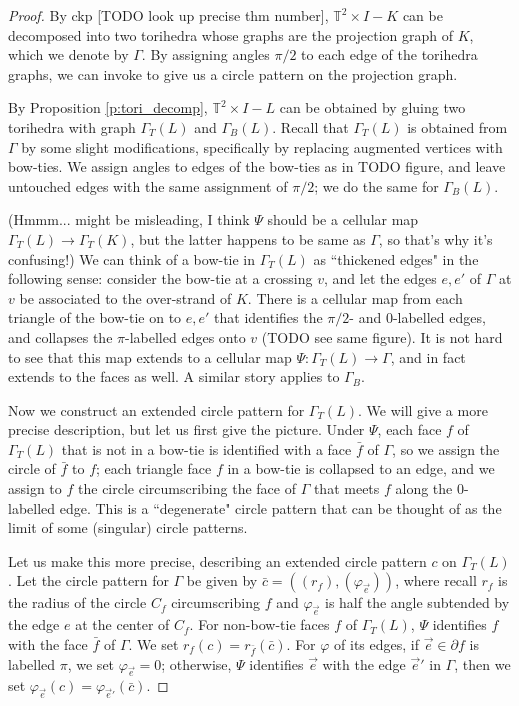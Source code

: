 \documentclass[11pt]{amsart}
\newcommand{\prpref}[1]{Proposition \ref{#1}}
\newcommand{\torus}{{\mathbb{T}^2}}
\newcommand{\del}{\partial}
\newcommand{\vphi}{\varphi}
\newcommand{\toruscomp}[1]{{\torus \times I - #1}}
\theoremstyle{plain}
\theoremstyle{definition}
\begin{document}
\begin{proof}
By ckp [TODO look up precise thm number],
$\toruscomp{K}$ can be decomposed
into two torihedra whose graphs are the projection graph of $K$,
which we denote by $\Gamma$.
By assigning angles $\pi/2$ to each edge of the torihedra graphs,
we can invoke \cite[Theorem 3]{BandS} to give us a circle pattern
on the projection graph.

By \prpref{p:tori_decomp}, $\toruscomp{L}$ can be
obtained by gluing two torihedra with graph $\Gamma_T(L)$ and $\Gamma_B(L)$.
Recall that $\Gamma_T(L)$ is obtained from $\Gamma$ by some slight
modifications, specifically by replacing augmented vertices with bow-ties.
We assign angles to edges of the bow-ties as in TODO figure,
and leave untouched edges with the same assignment of $\pi/2$;
we do the same for $\Gamma_B(L)$.


(Hmmm... might be misleading, I think $\Psi$ should be a cellular map
$\Gamma_T(L) \to \Gamma_T(K)$, but the latter happens to be
same as $\Gamma$, so that's why it's confusing!)
We can think of a bow-tie in $\Gamma_T(L)$ as ``thickened edges" in the
following sense: consider the bow-tie at a crossing $v$,
and let the edges $e,e'$ of $\Gamma$ at $v$
be associated to the over-strand of $K$.
There is a cellular map from each triangle of the bow-tie
on to $e, e'$ that identifies the $\pi/2$- and 0-labelled edges,
and collapses the $\pi$-labelled edges onto $v$
(TODO see same figure).
It is not hard to see that this map extends to a cellular map
$\Psi: \Gamma_T(L) \to \Gamma$,
and in fact extends to the faces as well.
A similar story applies to $\Gamma_B$.


Now we construct an extended circle pattern for $\Gamma_T(L)$.
We will give a more precise description,
but let us first give the picture.
Under $\Psi$,
each face $f$ of $\Gamma_T(L)$ that is not in a bow-tie
is identified with a face $\bar{f}$ of $\Gamma$,
so we assign the circle of $\bar{f}$ to $f$;
each triangle face $f$ in a bow-tie is collapsed to an edge,
and we assign to $f$ the circle circumscribing the
face of $\Gamma$ that meets $f$ along the 0-labelled edge.
This is a ``degenerate" circle pattern that can be thought of as
the limit of some (singular) circle patterns.


Let us make this more precise,
describing an extended circle pattern $c$
on $\Gamma_T(L)$.
Let the circle pattern for $\Gamma$ be given by
$\bar{c} = ((r_f),(\vphi_{\vec{e}}))$,
where recall $r_f$ is the radius of the circle $C_f$
circumscribing $f$ and $\vphi_{\vec{e}}$
is half the angle subtended by the edge $e$
at the center of $C_f$.
For non-bow-tie faces $f$ of $\Gamma_T(L)$,
$\Psi$ identifies $f$ with the face $\bar{f}$ of $\Gamma$.
We set $r_f(c) = r_{\bar{f}}(\bar{c})$.
For $\vphi$ of its edges,
if $\vec{e} \in \del f$ is labelled $\pi$,
we set $\vphi_{\vec{e}} = 0$;
otherwise, $\Psi$ identifies $\vec{e}$
with the edge $\vec{e}'$ in $\Gamma$,
then we set $\vphi_{\vec{e}}(c) = \vphi_{\vec{e}'}(\bar{c})$.



\end{proof}
\end{document}
